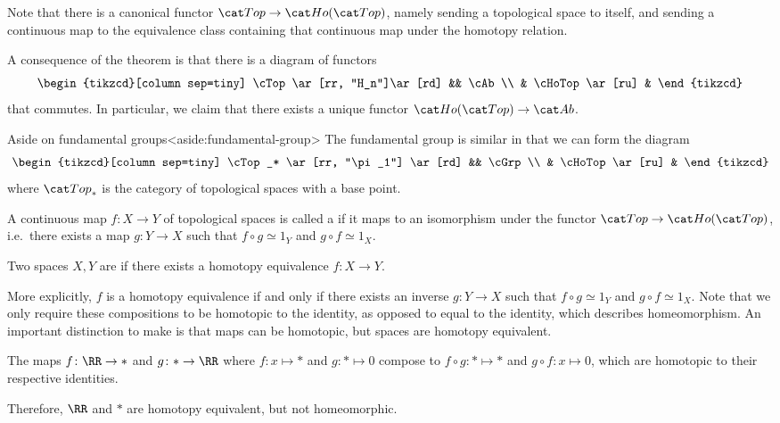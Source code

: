 \documentclass{standalone}
\begin{document}
Note that there is a canonical functor \(\cTop \to \cHoTop\), namely
sending a topological space to itself, and
sending a continuous map to the equivalence class containing that continuous
map under the homotopy relation.

A consequence of the theorem is that there is a diagram of functors
\[
  \begin{tikzcd}[column sep=tiny]
    \cTop \ar[rr, "H_n"]\ar[rd] && \cAb \\
    & \cHoTop \ar[ru] &
  \end{tikzcd}
\]
that commutes. In particular, we claim that there exists a unique functor
\(\cHoTop \to \cAb\).

\begin{adhoctheorem}{Aside on fundamental groups}<aside:fundamental-group>
  The fundamental group is similar in that we can form the diagram
  \[
    \begin{tikzcd}[column sep=tiny]
      \cTop_* \ar[rr, "\pi_1"] \ar[rd] && \cGrp \\
      & \cHoTop \ar[ru] &
    \end{tikzcd}
  \]
  where \(\cTop_*\) is the category of topological spaces with a base point.
\end{adhoctheorem}

\begin{definition}
  A continuous map \(f \colon X \to Y\) of topological spaces is called a
   if it maps to an isomorphism under the functor
  \(\cTop \to \cHoTop\), i.e.\ there exists a map \(g \colon Y \to X\)
  such that \(f \circ g \simeq 1_Y\) and \(g \circ f \simeq 1_X\).

  Two spaces \(X, Y\) are  if there exists
  a homotopy equivalence \(f \colon X \to Y\).
\end{definition}

More explicitly, \(f\) is a homotopy equivalence if and only if there exists
an inverse \(g \colon Y \to X\) such that \(f \circ g \simeq 1_Y\) and
\(g \circ f \simeq 1_X\). Note that we only require these compositions to
be homotopic to the identity, as opposed to equal to the identity, which
describes homeomorphism. An important distinction to make is that maps
can be homotopic, but spaces are homotopy equivalent.

\begin{example}
  The maps \(f \colon \RR \to *\) and \(g \colon * \to \RR\) where
  \(f \colon x \mapsto *\) and \(g \colon * \mapsto 0\) compose to
  \(f \circ g \colon * \mapsto *\) and \(g \circ f \colon x \mapsto 0\),
  which are homotopic to their respective identities.

  Therefore, \(\RR\) and \(*\) are homotopy equivalent, but not homeomorphic.
\end{example}
\end{document}
